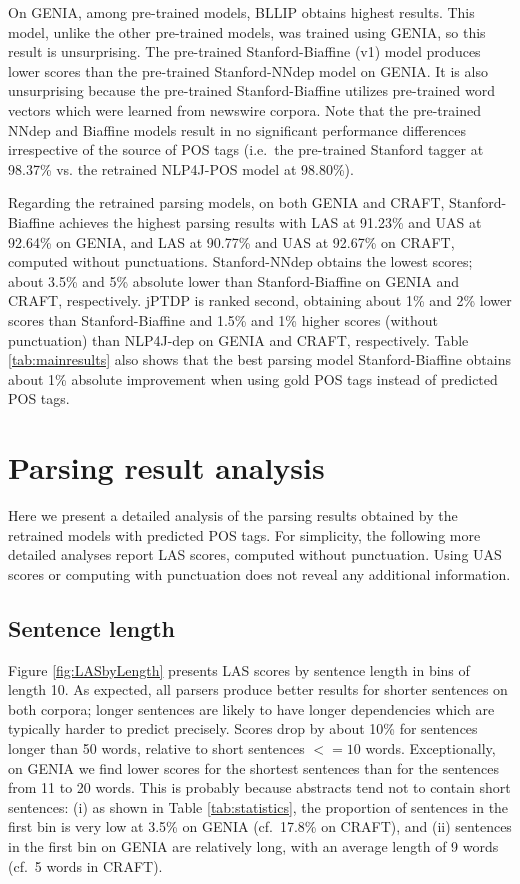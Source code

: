 \documentclass[twocolumn,hyperref]{bmcart}\pdfoutput=1
\newcommand{\CHANGEA}[1]{#1}
\begin{document}
On GENIA, among pre-trained models, BLLIP obtains highest results. This model, unlike the other pre-trained models, was trained using GENIA, so this result is unsurprising. The pre-trained Stanford-Biaffine  (v1) model produces lower scores than the pre-trained Stanford-NNdep model on GENIA. It is also unsurprising because the pre-trained Stanford-Biaffine utilizes pre-trained  word vectors  which were learned from newswire  corpora.  
Note that the pre-trained NNdep and Biaffine models result in no significant performance differences irrespective of the source of POS tags (i.e.\ the pre-trained Stanford tagger at 98.37\% vs. the retrained NLP4J-POS model at 98.80\%).


Regarding the retrained  parsing models, on both GENIA and CRAFT,   Stanford-Biaffine  achieves the highest parsing results with LAS at 91.23\% and UAS at 92.64\%  on GENIA, and LAS at 90.77\% and UAS at 92.67\% on CRAFT, computed without punctuations.  
Stanford-NNdep  obtains the lowest  scores; about 3.5\% and 5\% absolute lower  than Stanford-Biaffine on GENIA and CRAFT, respectively.  jPTDP is ranked second, obtaining about   1\% and 2\% lower scores than Stanford-Biaffine  and 1.5\% and 1\% higher scores  (without punctuation) than   NLP4J-dep on GENIA and CRAFT, respectively.   \CHANGEA{Table \ref{tab:mainresults} also shows that the best  parsing model  Stanford-Biaffine obtains    about 1\% absolute improvement when using gold POS tags instead of predicted POS tags. }



\section*{Parsing result analysis}\label{sssec:accuracyana}
Here we present a detailed  analysis of the parsing results obtained by the retrained  models  \CHANGEA{with predicted POS tags.} 
For simplicity,  the following more detailed analyses report LAS scores, computed  without punctuation. Using UAS  scores or computing with punctuation does not reveal any additional information.




\subsection*{Sentence length}

Figure \ref{fig:LASbyLength} presents LAS scores by sentence length in bins of length 10.  As expected, all parsers produce better results for shorter sentences on both corpora; longer sentences are likely to have longer dependencies which are typically harder to predict precisely. 
 Scores drop by about 10\% for sentences longer than 50 words, relative to short sentences ${<=}10$ words.  Exceptionally, on GENIA we find lower scores for the shortest sentences than for the  
sentences from 11 to 20 words. This is probably because abstracts tend not to contain short sentences: (i) as shown in Table \ref{tab:statistics},  
the proportion of sentences in the first bin is very low at 3.5\% on GENIA (cf.\ 17.8\% on CRAFT), and (ii)   sentences in the  first  bin on GENIA are relatively long, with an average length of 9 words (cf.\ 5 words in CRAFT).
\end{document}
